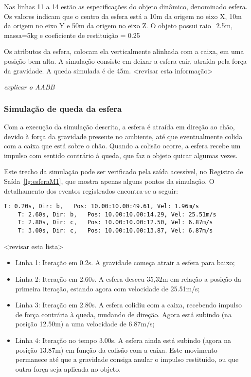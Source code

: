 \documentclass[12pt]{article}
\begin{document}
Nas linhas 11 a 14 estão as especificações do objeto dinâmico, denominado esfera. Os valores indicam que o centro da esfera está a 10m da origem no eixo X, 10m  da origem no eixo Y e 50m da origem no eixo Z. O objeto possui raio=2.5m, massa=5kg e coeficiente de restituição = 0.25

Os atributos da esfera, colocam ela verticalmente alinhada com a caixa, em uma posição bem alta. A simulação consiste em deixar a esfera cair, atraída pela força da gravidade. A queda simulada é de 45m. <revisar esta informação>


\emph{explicar o AABB}

\subsubsection{Simulação de queda da esfera}

Com a execução da simulação descrita, a esfera é atraída em direção ao chão, devido à força da gravidade presente no ambiente, até que eventualmente colida com a caixa que está sobre o chão. Quando a colisão ocorre, a esfera recebe um impulso com sentido contrário à queda, que faz o objeto quicar algumas vezes. 

Este trecho da simulação pode ser verificado pela saída acessível, no Registro de Saída~\ref{lg:esferaM1}, que mostra apenas alguns pontos da simulação. O detalhamento dos eventos registrados encontra-se a seguir:

\begin{lstlisting}[frame=single,caption=Queda da esfera. \label{lg:esferaM1}]
	T: 0.20s, Dir: b, 	Pos: 10.00:10.00:49.61, Vel: 1.96m/s
	T: 2.60s, Dir: b, 	Pos: 10.00:10.00:14.29, Vel: 25.51m/s
	T: 2.80s, Dir: c, 	Pos: 10.00:10.00:12.50, Vel: 6.87m/s
	T: 3.00s, Dir: c, 	Pos: 10.00:10.00:13.87, Vel: 6.87m/s
\end{lstlisting}

<revisar esta lista> 
\begin{itemize}
	\item Linha 1: Iteração em 0.2s. A gravidade começa atrair a esfera para baixo;
	\item Linha 2: Iteração em 2.60s. A esfera desceu 35,32m em relação a posição da primeira iteração, estando agora com velocidade de 25.51m/s;
	\item Linha 3: Iteração em 2.80s. A esfera colidiu com a caixa, recebendo impulso de força contrária à queda, mudando de direção. Agora está subindo (na posição 12.50m) a uma velocidade de 6.87m/s; 
	\item Linha 4: Iteração no tempo 3.00s. A esfera ainda está subindo (agora na posição 13.87m) em função da colisão com a caixa. Este movimento permanece até que a gravidade consiga anular o impulso restituído, ou que outra força seja aplicada no objeto.
\end{itemize}
\end{document}
